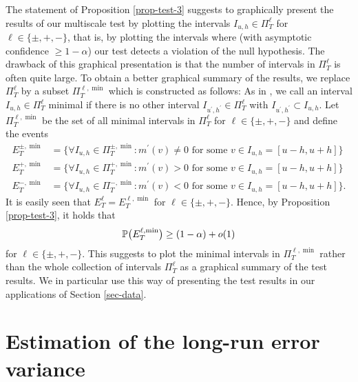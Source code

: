 The statement of Proposition \ref{prop-test-3} suggests to graphically present the results of our multiscale test by plotting the intervals $I_{u,h} \in \Pi_T^\ell$ for $\ell \in \{\pm, +,-\}$, that is, by plotting the intervals where (with asymptotic confidence $\ge 1-\alpha$) our test detects a violation of the null hypothesis. The drawback of this graphical presentation is that the number of intervals in $\Pi_T^\ell$ is often quite large. To obtain a better graphical summary of the results, we replace $\Pi_T^\ell$ by a subset $\Pi_T^{\ell,\min}$ which is constructed as follows: As in \cite{Duembgen2002}, we call an interval $I_{u,h} \in \Pi_T^\ell$ minimal if there is no other interval $I_{u^\prime,h^\prime} \in \Pi_T^\ell$ with $I_{u^\prime,h^\prime} \subset I_{u,h}$. Let $\Pi_T^{\ell,\min}$ be the set of all minimal intervals in $\Pi_T^\ell$ for $\ell \in \{\pm, +,-\}$ and define the events
\begin{align*}
E_T^{\pm,\min} & = \Big\{ \forall I_{u,h} \in \Pi_T^{\pm,\min}: m^\prime(v) \ne 0 \text{ for some } v \in I_{u,h} = [u-h,u+h] \Big\} \\
E_T^{+,\min} & = \Big\{ \forall I_{u,h} \in \Pi_T^{+,\min}: m^\prime(v) > 0 \text{ for some } v \in I_{u,h} = [u-h,u+h] \Big\} \\ 
E_T^{-,\min} & = \Big\{ \forall I_{u,h} \in \Pi_T^{-,\min}: m^\prime(v) < 0 \text{ for some } v \in I_{u,h} = [u-h,u+h] \Big\}.  
\end{align*}
It is easily seen that $E_T^\ell = E_T^{\ell,\min}$ for $\ell \in \{\pm, +,-\}$. Hence, by Proposition \ref{prop-test-3}, it holds that 
\[ \mathbb{P} \big(E_T^{\ell,\min}\big) \ge (1-\alpha) + o(1) \] 
for $\ell \in \{\pm, +,-\}$. This suggests to plot the minimal intervals in $\Pi_T^{\ell,\min}$ rather than the whole collection of intervals $\Pi_T^\ell$ as a graphical summary of the test results. We in particular use this way of presenting the test results in our applications of Section \ref{sec-data}. 



\section{Estimation of the long-run error variance}\label{sec-error-var}


